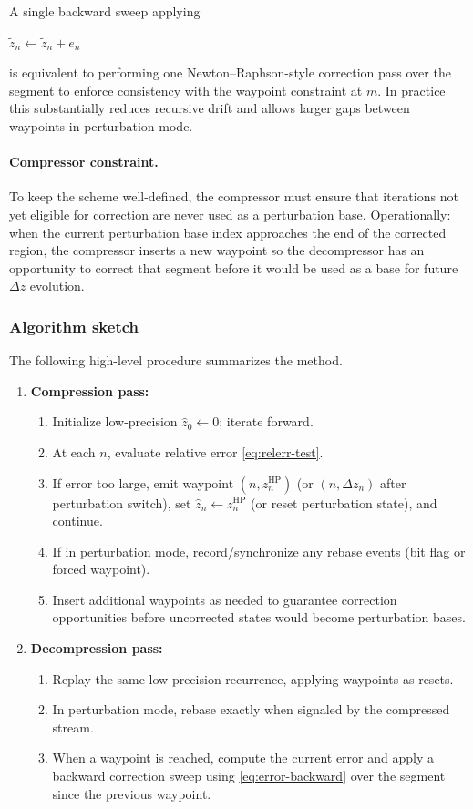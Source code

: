 A single backward sweep applying

\(
\tilde z_n \leftarrow \tilde z_n + e_n
\)

is equivalent to performing one Newton--Raphson-style correction pass over the
segment to enforce consistency with the waypoint constraint at \(m\).  In
practice this substantially reduces recursive drift and allows larger gaps
between waypoints in perturbation mode.

\paragraph{Compressor constraint.}
To keep the scheme well-defined, the compressor must ensure that iterations not
yet eligible for correction are never used as a perturbation base.  Operationally:
when the current perturbation base index approaches the end of the corrected
region, the compressor inserts a new waypoint so the decompressor has an
opportunity to correct that segment before it would be used as a base for future
\(\Delta z\) evolution.

\subsubsection{Algorithm sketch}

The following high-level procedure summarizes the method.

\begin{enumerate}
  \item \textbf{Compression pass:}
    \begin{enumerate}
      \item Initialize low-precision \(\hat z_0 \leftarrow 0\); iterate forward.
      \item At each \(n\), evaluate relative error \eqref{eq:relerr-test}.
      \item If error too large, emit waypoint \((n, z_n^{\mathrm{HP}})\) (or \((n,\Delta z_n)\) after perturbation switch),
            set \(\hat z_n \leftarrow z_n^{\mathrm{HP}}\) (or reset perturbation state), and continue.
      \item If in perturbation mode, record/synchronize any rebase events (bit flag or forced waypoint).
      \item Insert additional waypoints as needed to guarantee correction opportunities before uncorrected
            states would become perturbation bases.
    \end{enumerate}

  \item \textbf{Decompression pass:}
    \begin{enumerate}
      \item Replay the same low-precision recurrence, applying waypoints as resets.
      \item In perturbation mode, rebase exactly when signaled by the compressed stream.
      \item When a waypoint is reached, compute the current error and apply a backward correction sweep
            using \eqref{eq:error-backward} over the segment since the previous waypoint.
    \end{enumerate}
\end{enumerate}

